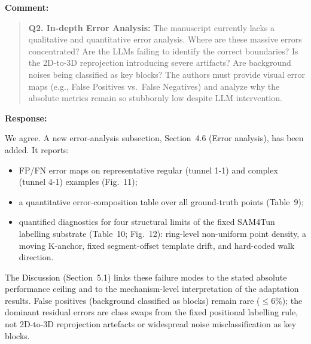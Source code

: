 \documentclass[11pt,a4paper]{article}
\newenvironment{commentblock}{%
  \par\smallskip\noindent\textbf{Comment:}\par
  \begin{quote}\itshape\color{black}
}{%
  \end{quote}\smallskip
}
\newenvironment{responseblock}{%
  \par\smallskip\noindent\textbf{Response:}\par
  \begingroup\color{responsegreen}
}{%
  \endgroup\smallskip
}
\begin{document}
\begin{commentblock}
\textbf{Q2. In-depth Error Analysis:} The manuscript currently lacks a qualitative and quantitative error analysis. Where are these massive errors concentrated? Are the LLMs failing to identify the correct boundaries? Is the 2D-to-3D reprojection introducing severe artifacts? Are background noises being classified as key blocks? The authors must provide visual error maps (e.g., False Positives vs.\ False Negatives) and analyze why the absolute metrics remain so stubbornly low despite LLM intervention.
\end{commentblock}
\begin{responseblock}
We agree. A new error-analysis subsection, Section~4.6 (Error analysis), has been added. It reports:
\begin{itemize}[nosep]
  \item FP/FN error maps on representative regular (tunnel 1-1) and complex (tunnel 4-1) examples (Fig.~11);
  \item a quantitative error-composition table over all ground-truth points (Table~9);
  \item quantified diagnostics for four structural limits of the fixed SAM4Tun labelling substrate (Table~10; Fig.~12): ring-level non-uniform point density, a moving K-anchor, fixed segment-offset template drift, and hard-coded walk direction.
\end{itemize}
The Discussion (Section~5.1) links these failure modes to the stated absolute performance ceiling and to the mechanism-level interpretation of the adaptation results. False positives (background classified as blocks) remain rare ($\leq$6\%); the dominant residual errors are class swaps from the fixed positional labelling rule, not 2D-to-3D reprojection artefacts or widespread noise misclassification as key blocks.
\end{responseblock}
\end{document}
